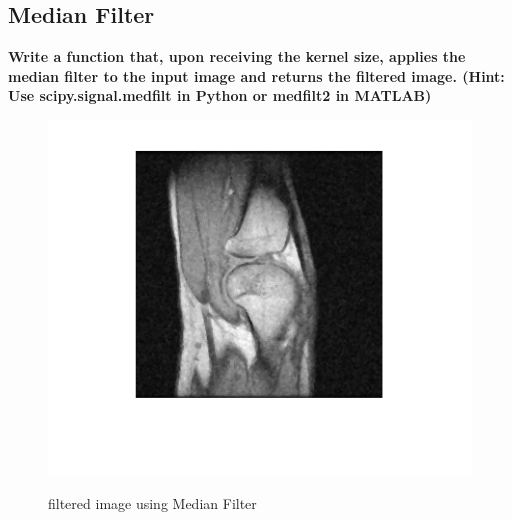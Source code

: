 \documentclass[11pt]{article}
\begin{document}
\subsection{Median Filter}
\textbf{Write a function that, upon receiving the kernel size, applies the median filter to the input
image and returns the filtered image. (Hint: Use scipy.signal.medfilt in Python or medfilt2 in
MATLAB)} \\


\begin{figure}[H]
    \begin{center}
        \includegraphics[scale=0.6]{Fig/median.knee.png}
        \label{fig:MedianKnee}
        \caption{filtered image using Median Filter}
    \end{center}
\end{figure}
\end{document}
